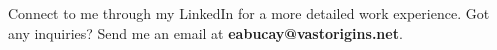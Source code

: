 
\begin{cvcontactinfo}
    {Connect to me through my LinkedIn for a more detailed work experience. Got any inquiries? \newline
    Send me an email at \textbf{eabucay@vastorigins.net}.}
\end{cvcontactinfo}



